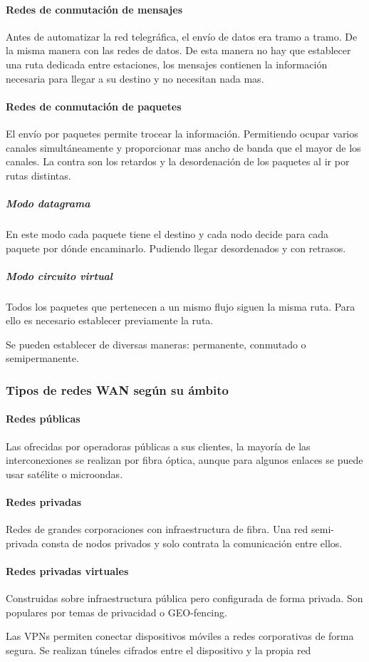         \paragraph{Redes de conmutación de mensajes} %
            Antes de automatizar la red telegráfica, el envío de datos era tramo a tramo. De la misma manera con las redes de datos. De esta manera no hay que establecer una ruta dedicada entre estaciones, los mensajes contienen la información necesaria para llegar a su destino y no necesitan nada mas.

        \paragraph{Redes de conmutación de paquetes} %
            El envío por paquetes permite trocear la información. Permitiendo ocupar varios canales simultáneamente y proporcionar mas ancho de banda que el mayor de los canales. La contra son los retardos y la desordenación de los paquetes al ir por rutas distintas.

            \subparagraph{Modo datagrama}
                En este modo cada paquete tiene el destino y cada nodo decide para cada paquete por dónde encaminarlo. Pudiendo llegar desordenados y con retrasos.

            \subparagraph{Modo circuito virtual}
                Todos los paquetes que pertenecen a un mismo flujo siguen la misma ruta. Para ello es necesario establecer previamente la ruta.

                Se pueden establecer de diversas maneras: permanente, conmutado o semipermanente.

    \subsubsection{Tipos de redes WAN según su ámbito} %
        \paragraph{Redes públicas} %
            Las ofrecidas por operadoras públicas a sus clientes, la mayoría de las interconexiones se realizan por fibra óptica, aunque para algunos enlaces se puede usar satélite o microondas.

        \paragraph{Redes privadas }%
            Redes de grandes corporaciones con infraestructura de fibra. Una red semi-privada consta de nodos privados y solo contrata la comunicación entre ellos.

        \paragraph{Redes privadas virtuales} %
            Construidas sobre infraestructura pública pero configurada de forma privada. Son populares por temas de privacidad o GEO-fencing.

            Las VPNs permiten conectar dispositivos móviles a redes corporativas de forma segura. Se realizan túneles cifrados entre el dispositivo y la propia red
